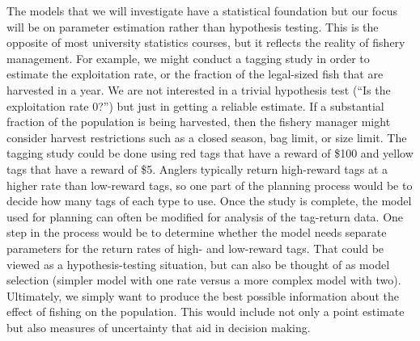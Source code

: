 \documentclass[
]{krantz}
\begin{document}
The models that we will investigate have a statistical foundation but our focus will be on parameter estimation rather than hypothesis testing. This is the opposite of most university statistics courses, but it reflects the reality of fishery management. For example, we might conduct a tagging study in order to estimate the exploitation rate, or the fraction of the legal-sized fish that are harvested in a year. We are not interested in a trivial hypothesis test (``Is the exploitation rate 0?'') but just in getting a reliable estimate. If a substantial fraction of the population is being harvested, then the fishery manager might consider harvest restrictions such as a closed season, bag limit, or size limit. The tagging study could be done using red tags that have a reward of \$100 and yellow tags that have a reward of \$5. Anglers typically return high-reward tags at a higher rate than low-reward tags, so one part of the planning process would be to decide how many tags of each type to use. Once the study is complete, the model used for planning can often be modified for analysis of the tag-return data. One step in the process would be to determine whether the model needs separate parameters for the return rates of high- and low-reward tags. That could be viewed as a hypothesis-testing situation, but can also be thought of as model selection (simpler model with one rate versus a more complex model with two). Ultimately, we simply want to produce the best possible information about the effect of fishing on the population. This would include not only a point estimate but also measures of uncertainty that aid in decision making.
\end{document}
